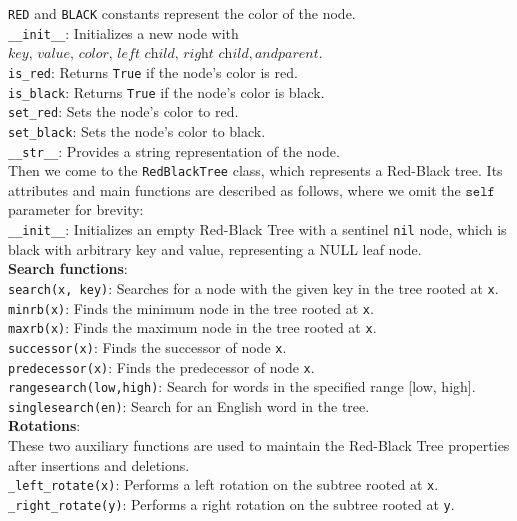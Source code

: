 \documentclass[UTF8]{ctexart}
\begin{document}
\texttt{RED} and \texttt{BLACK} constants represent the color of the node.\\
\texttt{\_\_init\_\_}: Initializes a new node with $\textit{key, value, color, left child, right child}, and \textit{parent}$.\\
\texttt{is\_red}: Returns \texttt{True} if the node's color is red.\\
\texttt{is\_black}: Returns \texttt{True} if the node's color is black.\\
\texttt{set\_red}: Sets the node's color to red.\\
\texttt{set\_black}: Sets the node's color to black.\\
\texttt{\_\_str\_\_}: Provides a string representation of the node.\\

Then we come to the \texttt{RedBlackTree} class, which represents a Red-Black tree. Its attributes and main functions are
described as follows, where we omit the $\texttt{self}$ parameter for brevity:\\
\texttt{\_\_init\_\_}: Initializes an empty Red-Black Tree with a sentinel \texttt{nil} node, which is black with arbitrary key and value, representing a NULL leaf node.\\

\textbf{Search functions}:\\
\texttt{search(x, key)}: Searches for a node with the given key in the tree rooted at \texttt{x}.\\
\texttt{minrb(x)}: Finds the minimum node in the tree rooted at \texttt{x}.\\
\texttt{maxrb(x)}: Finds the maximum node in the tree rooted at \texttt{x}.\\
\texttt{successor(x)}: Finds the successor of node \texttt{x}.\\
\texttt{predecessor(x)}: Finds the predecessor of node \texttt{x}.\\
\texttt{rangesearch(low,high)}: Search for words in the specified range [low, high].\\
\texttt{singlesearch(en)}: Search for an English word in the tree.\\

\textbf{Rotations}:\\
These two auxiliary functions are used to maintain the Red-Black Tree properties after insertions and deletions.\\
\texttt{\_left\_rotate(x)}: Performs a left rotation on the subtree rooted at \texttt{x}.\\
\texttt{\_right\_rotate(y)}: Performs a right rotation on the subtree rooted at \texttt{y}.\\
\end{document}
